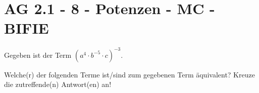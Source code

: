\section{AG 2.1 - 8 - Potenzen - MC - BIFIE}

\begin{beispiel}[AG 2.1]{1} %
		Gegeben ist der Term $(a^4 \cdot b^{-5} \cdot c)^{-3}$.
				
				\leer
				
Welche(r) der folgenden Terme ist/sind zum gegebenen Term äquivalent?
Kreuze die zutreffende(n) Antwort(en) an! 				
				
				
\end{beispiel}